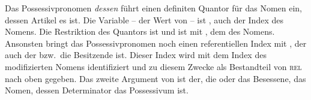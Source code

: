 \z
Das Possessivpronomen \emph{dessen} führt einen definiten Quantor für das Nomen ein, dessen Artikel
es ist. Die Variable -- der Wert von \argzero{} -- ist , auch der Index des Nomens. Die Restriktion des Quantors ist
 und  ist \qeq mit , dem \ltopw des Nomens. Ansonsten bringt das
Possessivpronomen noch einen referentiellen Index mit , der auch der bzw.\ die Besitzende
ist. Dieser Index wird mit dem Index des modifizierten Nomens identifiziert und zu diesem Zwecke als
Bestandteil von \textsc{rel} nach oben gegeben. Das zweite Argument von 
 ist der, die oder das Besessene, das Nomen, dessen Determinator das Possessivum ist.


